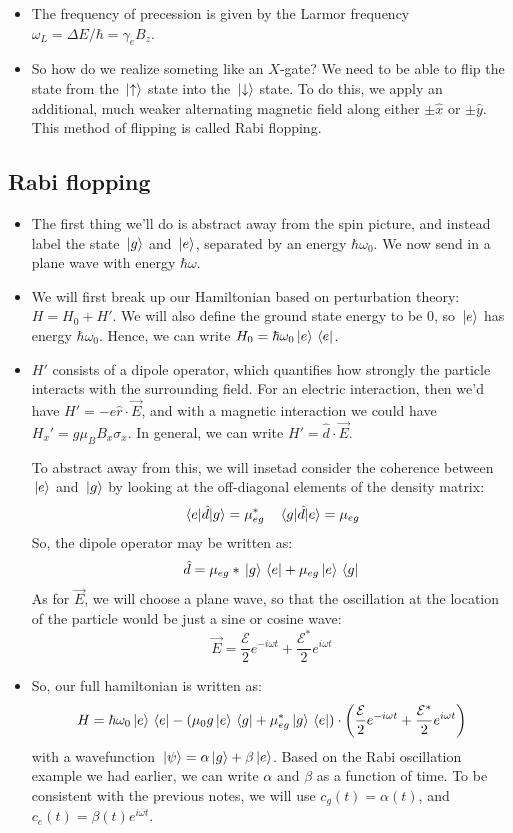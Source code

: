 \begin{itemize}
	\item The frequency of precession is given by the Larmor 
		frequency \( \omega_L = \Delta E / \hbar = \gamma_e B_z \). 
	\item So how do we realize someting like an \( X \)-gate? We need to be able to flip the state from 
		the \( \ket*{\uparrow} \) state into the \( \ket*{\downarrow} \) state. To do this, we apply an additional, 
		much weaker alternating magnetic field along either 
		\( \pm \hat{x} \) or \( \pm \hat{y} \). This method of flipping is called Rabi flopping.  
\end{itemize}
\subsection{Rabi flopping} 
\begin{itemize}
	\item The first thing we'll do is abstract away from the spin picture, and instead label the state 
		\( \ket*{g}  \) and \( \ket*{e} \), separated by an energy  \( \hbar \omega_0 \). We now send in a 
		plane wave with energy \( \hbar \omega \). 
	\item We will first break up our Hamiltonian based on perturbation theory: \( H = H_0 + H' \). We will also 
		define the ground state energy to be 0, so \( \ket*{e} \) has energy \( \hbar \omega_0 \). Hence, 
		we can write \( H_0 = \hbar \omega_0\ket*{e}\bra*{e} \). 
	\item \( H' \) consists of a dipole operator, which quantifies how strongly the particle interacts with the 
		surrounding field. For an electric interaction, then we'd have \( H' = - e \hat{r} \cdot \vec E \), and 
		with a magnetic interaction we could have \( H_x' = g \mu_B B_x \sigma_x \). In general, we can 
		write \( H' = \hat{d} \cdot \vec E \).

		To abstract away from this, we will insetad consider the coherence between \( \ket*{e} \) and 
		\( \ket*{g} \) by looking at the off-diagonal elements of the density matrix:
		\[
			\mel{e}{\hat{d}}{g} = \mu_{eg}^{*} \quad \mel{g}{\hat{d}}{e} = \mu_{eg}
		\] 
		So, the dipole operator may be written as:
		\[
		\hat{d} = \mu_{eg}* \ket*{g}\bra*{e} + \mu_{eg} \ket*{e}\bra*{g}
		\] 
		As for \( \vec E \), we will choose a plane wave, so that the oscillation at the location of the particle 
		would be just a sine or cosine wave:
		\[
		\vec E = \frac{\mathcal E}{2}e^{- i \omega t} + \frac{\mathcal E^{*}}{2}e^{i \omega t}
		\] 
	\item So, our full hamiltonian is written as:
		\[
		H = \hbar \omega_0 \ket*{e} \bra*{e} - (\mu_0g \ket*{e}\bra*{g} + \mu_{eg}^{*}\ket*{g}\bra*{e})\cdot 
		\left( \frac{\mathcal E}{2}e^{-i \omega t} + \frac{\mathcal E^{*}}{2} e^{ i \omega t}\right) 
		\] 
		with a wavefunction \( \ket*{\psi} = \alpha \ket*{g} + \beta \ket*{e} \). Based on the Rabi oscillation 
		example we had earlier, we can write \( \alpha \) and \( \beta \) as a function of time. To be consistent
		with the previous notes, we will use \( c_g(t) = \alpha(t) \), and \( c_e(t) = \beta(t) e^{i \omega t} \).


\end{itemize}

